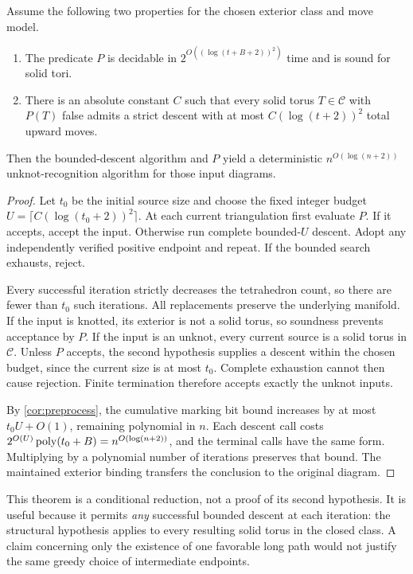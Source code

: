 \begin{theorem}\label{thm:conditional}
Assume the following two properties for the chosen exterior class and move
model.
\begin{enumerate}
\item The predicate $P$ is decidable in
$2^{O((\log(t+B+2))^2)}$ time and is sound for solid tori.
\item There is an absolute constant $C$ such that every solid torus
$T\in\mathcal C$ with $P(T)$ false admits a strict descent with at most
$C(\log(t+2))^2$ total upward moves.
\end{enumerate}
Then the bounded-descent algorithm and $P$ yield a deterministic
$n^{O(\log(n+2))}$ unknot-recognition algorithm for those input diagrams.
\end{theorem}
\begin{proof}
Let $t_0$ be the initial source size and choose the fixed integer budget
$U=\lceil C(\log(t_0+2))^2\rceil$. At each current triangulation first evaluate $P$.
If it accepts, accept the input. Otherwise run complete bounded-$U$ descent.
Adopt any independently verified positive endpoint and repeat. If the
bounded search exhausts, reject.

Every successful iteration strictly decreases the tetrahedron count, so
there are fewer than $t_0$ such iterations. All replacements preserve the
underlying manifold. If the input is knotted, its exterior is not a solid
torus, so soundness prevents acceptance by $P$. If the input is an unknot,
every current source is a solid torus in $\mathcal C$. Unless $P$ accepts,
the second hypothesis supplies a descent within the chosen budget, since
the current size is at most $t_0$. Complete exhaustion cannot then cause
rejection. Finite termination therefore accepts exactly the unknot inputs.

By \cref{cor:preprocess}, the cumulative marking bit bound increases by at
most $t_0U+O(1)$, remaining polynomial in $n$. Each descent call costs
$2^{O(U)}\operatorname{poly}(t_0+B)=n^{O(\log(n+2))}$, and the terminal calls have the
same form. Multiplying by a polynomial number of iterations preserves
that bound. The maintained exterior binding transfers the conclusion to
the original diagram.
\end{proof}

This theorem is a conditional reduction, not a proof of its second
hypothesis. It is useful because it permits \emph{any} successful bounded
descent at each iteration: the structural hypothesis applies to every
resulting solid torus in the closed class. A claim concerning only the
existence of one favorable long path would not justify the same greedy
choice of intermediate endpoints.

